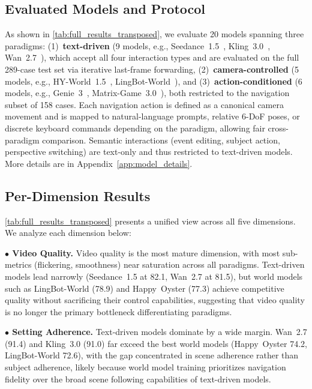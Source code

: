 \documentclass{llmxive}
\providecommand{\eg}{e.g.,\xspace}
\providecommand{\myparagraph}[1]{\vspace{-0.1em}\noindent\textbf{#1}\hspace{0.3em}}
\providecommand{\nummodel}{{20}\xspace}
\providecommand{\numvideo}{289\xspace}
\providecommand{\numnavi}{158\xspace}
\begin{document}
\subsection{Evaluated Models and Protocol}
\label{sec:eval_protocol}

As shown in \cref{tab:full_results_transposed}, we evaluate \nummodel models spanning three paradigms: (1)~\textbf{text-driven} (9 models, \eg Seedance~1.5~\cite{gao2025seedance15}, Kling~3.0~\cite{kuaishou2025kling3}, Wan~2.7~\cite{wan2025wan27}), which accept all four interaction types and are evaluated on the full \numvideo-case test set via iterative last-frame forwarding,
(2)~\textbf{camera-controlled} (5 models, \eg HY-World~1.5~\cite{sun2025hyworldplay}, LingBot-World~\cite{gao2026lingbot}), and
(3)~\textbf{action-conditioned} (6 models, \eg Genie~3~\cite{ball2025genie3}, Matrix-Game~3.0~\cite{he2026matrixgame3}), both restricted to the navigation subset of \numnavi cases.
Each navigation action is defined as a canonical camera movement and is mapped to natural-language prompts, relative 6-DoF poses, or discrete keyboard commands depending on the paradigm, allowing fair cross-paradigm comparison.
Semantic interactions (event editing, subject action, perspective switching) are text-only and thus restricted to text-driven models. More details are in Appendix~\ref{app:model_details}.


\subsection{Per-Dimension Results}
\label{sec:per_dimension}

\cref{tab:full_results_transposed} presents a unified view across all five dimensions. We analyze each dimension below:

\myparagraph{$\bullet$ Video Quality.}
Video quality is the most mature dimension, with most sub-metrics (flickering, smoothness) near saturation across all paradigms. Text-driven models lead narrowly (Seedance~1.5 at 82.1, Wan~2.7 at 81.5), but world models such as LingBot-World (78.9) and Happy~Oyster (77.3) achieve competitive quality without sacrificing their control capabilities, suggesting that video quality is no longer the primary bottleneck differentiating paradigms.

\myparagraph{$\bullet$ Setting Adherence.}
Text-driven models dominate by a wide margin. Wan~2.7 (91.4) and Kling~3.0 (91.0) far exceed the best world models (Happy~Oyster 74.2, LingBot-World 72.6), with the gap concentrated in scene adherence rather than subject adherence, likely because world model training prioritizes navigation fidelity over the broad scene following capabilities of text-driven models.
\end{document}

